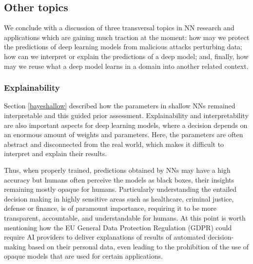 
\iffalse


\subsection{Other topics}
We conclude with a discussion of three transversal topics in NN
research and applications which are gaining much traction at the moment: how may we protect the predictions of deep
learning models from malicious attacks perturbing data; how can we interpret or explain the predictions of a deep model; and, finally, how may we reuse what a deep model
learns in a domain into another related context. 



\subsubsection{Explainability}

Section \ref{bayeshallow} described how the parameters 
in shallow NNs remained interpretable and this  guided
prior assessment. Explainability and interpretability are also important aspects for deep learning models,
where a decision depends on an enormous amount of weights and parameters. Here, the parameters are often abstract and disconnected from the real world, which makes it difficult to interpret and explain their results.


Thus, when properly trained, predictions obtained by
NNs may have a high accuracy but humans
often perceive the models as black boxes, their insights
remaining mostly
opaque for humans. Particularly understanding 
the entailed decision making in highly sensitive
areas such as healthcare, criminal justice, defense or finance, is of paramount importance,
requiring it to be more transparent, accountable, and understandable
for humans.
At this point is worth mentioning how the 
EU General Data Protection Regulation (GDPR) could require AI providers to deliver explanations of results of automated decision-making based on their personal data, even leading to the prohibition of the use of opaque models that are used for certain applications.

